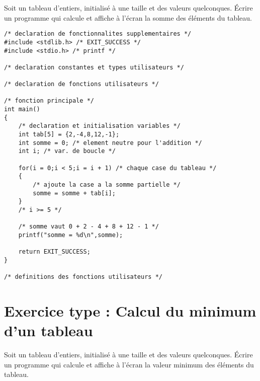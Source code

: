 Soit un tableau d'entiers, initialisé à une taille et des
valeurs quelconques. Écrire un programme qui calcule et affiche à
l'écran la somme des éléments du tableau.

\begin{correction}
\begin{verbatim}
/* declaration de fonctionnalites supplementaires */
#include <stdlib.h> /* EXIT_SUCCESS */
#include <stdio.h> /* printf */

/* declaration constantes et types utilisateurs */

/* declaration de fonctions utilisateurs */

/* fonction principale */
int main()
{
    /* declaration et initialisation variables */
    int tab[5] = {2,-4,8,12,-1};
    int somme = 0; /* element neutre pour l'addition */
    int i; /* var. de boucle */

    for(i = 0;i < 5;i = i + 1) /* chaque case du tableau */
    {
        /* ajoute la case a la somme partielle */
        somme = somme + tab[i];
    }
    /* i >= 5 */

    /* somme vaut 0 + 2 - 4 + 8 + 12 - 1 */
    printf("somme = %d\n",somme);

    return EXIT_SUCCESS;
}

/* definitions des fonctions utilisateurs */
\end{verbatim}
\end{correction}

\section{Exercice type : Calcul du minimum d'un tableau}
 
Soit un tableau d'entiers, initialisé à une taille et des
valeurs quelconques. Écrire un programme qui calcule et affiche à
l'écran la valeur minimum des éléments du tableau.

